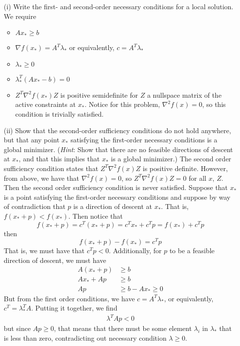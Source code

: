 \documentclass{article}
\begin{document}
\begin{itemize}
    \item[(i)] Write the first- and second-order necessary conditions for a local solution.
    \newline\newline
    We require
    \begin{itemize}
        \item $Ax_* \geq b$

        \item $\nabla f(x_*) = A^T\lambda_*$ or equivalently, $c = A^T\lambda_*$

        \item $\lambda_* \geq 0$

        \item $\lambda_*^T(Ax_* - b) = 0$

        \item $Z^T\nabla^2f(x_*)Z$ is positive semidefinite for $Z$ a nullspace matrix of the active constraints at $x_*$. Notice for this problem, $\nabla^2f(x) = 0$, so this condition is trivially satisfied. 
    \end{itemize}

    \item[(ii)] Show that the second-order sufficiency conditions do not hold anywhere, but that any point $x_*$ satisfying the first-order necessary conditions is a global minimizer. (\textit{Hint}: Show that there are no feasible directions of descent at $x_*$, and that this implies that $x_*$ is a global minimizer.)
    \newline\newline
    The second order sufficiency condition states that $Z^T\nabla^2f(x)Z$ is positive definite. However, from above, we have that $\nabla^2f(x) = 0$, so $Z^T\nabla^2f(x)Z = 0$ for all $x$, $Z$. Then the second order sufficiency condition is never satisfied. 
    \newline
    Suppose that $x_*$ is a point satisfying the first-order necessary conditions and suppose by way of contradiction that $p$ is a direction of descent at $x_*$. That is, $f(x_* + p) < f(x_*)$. Then notice that
    \[f(x_* + p) = c^T(x_* + p) = c^Tx_* + c^Tp = f(x_*) + c^Tp\]
    then
    \[f(x_* + p) - f(x_*) = c^Tp\]
    That is, we must have that $c^Tp < 0$. Additionally, for $p$ to be a feasible direction of descent, we must have
    \begin{align*}
        A(x_* + p) &\geq b\\
        Ax_* + Ap &\geq b\\
        Ap &\geq b - Ax_* \geq 0
    \end{align*}
    But from the first order conditions, we have $c = A^T\lambda_*$, or equivalently, $c^T = \lambda_*^TA$. Putting it together, we find
    \begin{align*}
        \lambda^TAp < 0
    \end{align*}
    but since $Ap \geq 0$, that means that there must be some element $\lambda_i$ in $\lambda_*$ that is less than zero, contradicting out necessary condition $\lambda \geq 0$.
    \newline\newline
\end{itemize}
\end{document}
